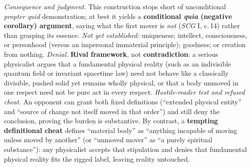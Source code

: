 \emph{Consequence and judgment.} This construction stops short of unconditional \emph{propter quid} demonstration; at best it yields a \textbf{conditional \emph{quia} (negative corollary) argument}, saying what the first mover is \emph{not} (\emph{SCG} I, c.\,14) rather than grasping its essence. \emph{Not yet established:} uniqueness; intellect, consciousness, or personhood (versus an impersonal immaterial principle); goodness; or creation from nothing. \emph{Denial.} \textbf{Rival framework}, not \textbf{contradiction}: a serious physicalist argues that a fundamental physical reality (such as an indivisible quantum field or invariant spacetime law) need not behave like a classically divisible, pushed solid yet remains wholly physical, or that a body unmoved in one respect need not be pure act in every respect. \emph{Hostile-reader test and refused cheat.} An opponent can grant both fixed definitions (``extended physical entity'' and ``source of change not itself moved in that order'') and still deny the conclusion, proving the burden is substantive. By contrast, a \textbf{tempting definitional cheat} defines ``material body'' as ``anything incapable of moving unless moved by another'' (or ``unmoved mover'' as ``a purely spiritual substance''): any physicalist accepts that stipulation and denies that fundamental physical reality fits the rigged label, leaving reality untouched.
